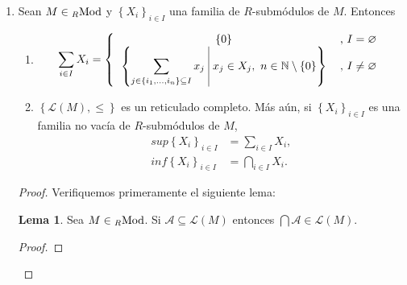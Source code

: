 \documentclass{article}
\newcommand{\lrprth}[1]{
	\left(#1\right)
}
\newcommand{\lrbrack}[1]{
	\left\{#1\right\}
}
\newcommand{\arbtfam}[3]{
	{\left\{{#1}_{#2}\right\}}_{#2\in #3}
}
\newcommand{\gengroup}[1]{
	\left< #1\right>
}
\newcommand{\genlin}[1]{
	\mathscr{L}\lrprth{#1}
}
\newcommand{\ringmod}[3]{
	\if#3l
	{}_{#1}#2
	\else
	\if#3r
	#2_{#1}
	\fi
	\fi
}
\theoremstyle{definition}
\newtheorem{define}{Definición}
\theoremstyle{plain}
\theoremstyle{plain}
\theoremstyle{definition}
\theoremstyle{definition}
\theoremstyle{definition}
\theoremstyle{definition}
\theoremstyle{definition}
\newtheorem{lem}{Lema}
\theoremstyle{definition}
\begin{document}
\begin{enumerate}[label=\textbf{Ej \arabic*.}]
\begin{proof}
	$\boxed{\Leftarrow}$ Ahora supongamos que  $i_X:X\longrightarrow M$ es un morfismo de $R$ módulos.\\
	
	Sean $x,y\in X$ y $r\in R$, como $X$ es un $R$ módulo a izquierda entonces $x+y\in X$ y como $i_X$ es morfismo
	se tiene que, si $\cdot: R\times X\longrightarrow X$ es la acción de $R$ módulo en $X$, entonces 
	$r\cdot x = r\cdot i_X(x) = i_X(rx)=rx $. Así, como $X\subset M$, entonces $X\leq M$.\\
\end{proof}
\begin{define}
	Sean $M\in\ringmod{R}{\text{Mod}}{l}$ y $\arbtfam{X}{i}{I}$ una familia de $R$-submódulos de $M$. Definimos la suma de la familia $\arbtfam{X}{i}{I}$ como
	\begin{equation*}
		\sum_{i\in I}X_i:=\gengroup{\bigcup_{i\in I}X_i}_R.
	\end{equation*}
\end{define}
\item Sean $M\in\ringmod{R}{\text{Mod}}{l}$ y $\arbtfam{X}{i}{I}$ una familia de $R$-submódulos de $M$. Entonces
\begin{enumerate}[label=(\alph*)]
	\item \begin{equation*}
		\sum_{i\in I}X_i=\left\{\begin{tabular}{cc}
			$\lrbrack{0}$ &, $I=\varnothing$  \\
			\(\displaystyle
			\lrbrack{\sum_{j\in\lrbrack{i_1,\dotsc,i_n}\subseteq I}x_j\ \vline\ x_j\in X_j,\ n\in\mathbb{N}\setminus\lrbrack{0}}\) & , $I\neq\varnothing$
		\end{tabular}\right.
	\end{equation*}
	\item $\lrbrack{\genlin{M},\leq}$ es un reticulado completo. Más aún, si $\arbtfam{X}{i}{I}$ es una familia no vacía de $R$-submódulos de $M$,
	\begin{align*}
		sup\arbtfam{X}{i}{I}&=\sum_{i\in I}X_i,\\
		inf\arbtfam{X}{i}{I}&=\bigcap_{i\in I}X_i.
	\end{align*}
\end{enumerate}
\begin{proof}
	Verifiquemos primeramente el siguiente lema:
	\begin{lem}
		Sea $M\in\ringmod{R}{\text{Mod}}{l}$. Si $\mathcal{A}\subseteq\genlin{M}$ entonces $\bigcap \mathcal{A}\in\genlin{M}$.
	\end{lem}
	\begin{proof}

\end{proof}
\end{proof}
\end{enumerate}
\end{document}
